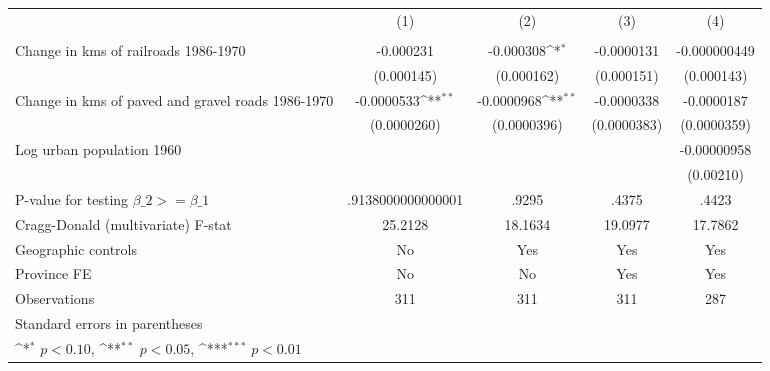 {
\def\sym#1{\ifmmode^{#1}\else\(^{#1}\)\fi}
\begin{tabular}{l*{4}{c}}
\hline\hline
                &\multicolumn{1}{c}{(1)}&\multicolumn{1}{c}{(2)}&\multicolumn{1}{c}{(3)}&\multicolumn{1}{c}{(4)}\\
                &\multicolumn{1}{c}{}&\multicolumn{1}{c}{}&\multicolumn{1}{c}{}&\multicolumn{1}{c}{}\\
\hline
Change in kms of railroads 1986-1970&-0.000231         &-0.000308\sym{*}  &-0.0000131         &-0.000000449         \\
                &(0.000145)         &(0.000162)         &(0.000151)         &(0.000143)         \\
[1em]
Change in kms of paved and gravel roads 1986-1970&-0.0000533\sym{**} &-0.0000968\sym{**} &-0.0000338         &-0.0000187         \\
                &(0.0000260)         &(0.0000396)         &(0.0000383)         &(0.0000359)         \\
[1em]
Log urban population 1960&                  &                  &                  &-0.00000958         \\
                &                  &                  &                  &(0.00210)         \\
\hline
P-value for testing $\beta\_{2} >= \beta\_{1}$&.9138000000000001         &    .9295         &    .4375         &    .4423         \\
Cragg-Donald (multivariate) F-stat&  25.2128         &  18.1634         &  19.0977         &  17.7862         \\
Geographic controls&       No         &      Yes         &      Yes         &      Yes         \\
Province FE     &       No         &       No         &      Yes         &      Yes         \\
Observations    &      311         &      311         &      311         &      287         \\
\hline\hline
\multicolumn{5}{l}{\footnotesize Standard errors in parentheses}\\
\multicolumn{5}{l}{\footnotesize \sym{*} \(p<0.10\), \sym{**} \(p<0.05\), \sym{***} \(p<0.01\)}\\
\end{tabular}
}
